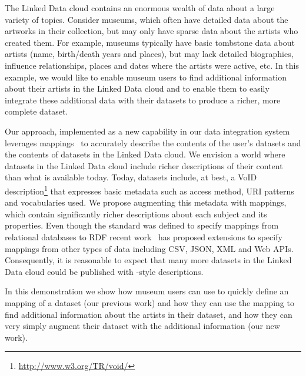 The Linked Data cloud contains an enormous wealth of data about a large variety of topics.
Consider museums, which often have detailed data about the artworks in their collection, but may only have sparse data about the artists who created them.
For example, museums typically have basic tombstone data about artists (name, birth/death years and places), but may lack detailed biographies, influence relationships, places and dates where the artists were active, etc.
In this example, we would like to enable museum users to find additional information about their artists in the Linked Data cloud and to enable them to easily integrate these additional data with their datasets to produce a richer, more complete dataset.

Our approach, implemented as a new capability in our \karma data integration system~\cite{knoblock12:eswc} leverages \rtworml mappings~\cite{Sundara:12:RRR} to accurately describe the contents of the user's datasets and the contents of datasets in the Linked Data cloud.
We envision a world where datasets in the Linked Data cloud include richer descriptions of their content than what is available today.
Today, datasets include, at best, a VoID description\footnote{\url{http://www.w3.org/TR/void/}} that expresses basic metadata such as access method, URI patterns and vocabularies used.
We propose augmenting this metadata with \rtworml mappings, which contain significantly richer descriptions about each subject and its properties.
Even though the \rtworml standard was defined to specify mappings from relational databases to RDF recent work~\cite{conf/semweb/DimouSCMW13} has proposed extensions to specify mappings from other types of data including CSV, JSON, XML and Web APIs.
Consequently, it is reasonable to expect that many more datasets in the Linked Data cloud could be published with \rtworml-style descriptions.

In this demonstration we show how museum users can use \karma to quickly define an \rtworml mapping of a dataset (our previous work) and how they can use the \rtworml mapping to find additional information about the artists in their dataset, and how they can very simply augment their dataset with the additional information (our new work).

